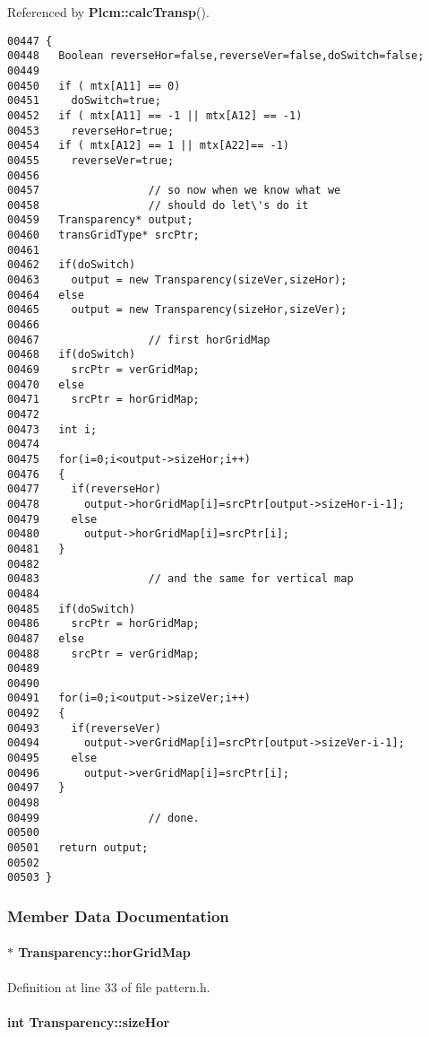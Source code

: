 Referenced by {\bf Plcm::calc\-Transp}().\small\begin{verbatim}00447 {
00448   Boolean reverseHor=false,reverseVer=false,doSwitch=false;
00449 
00450   if ( mtx[A11] == 0)
00451     doSwitch=true;
00452   if ( mtx[A11] == -1 || mtx[A12] == -1)
00453     reverseHor=true;
00454   if ( mtx[A12] == 1 || mtx[A22]== -1)
00455     reverseVer=true;
00456 
00457                 // so now when we know what we 
00458                 // should do let\'s do it
00459   Transparency* output;
00460   transGridType* srcPtr;
00461 
00462   if(doSwitch)
00463     output = new Transparency(sizeVer,sizeHor);
00464   else
00465     output = new Transparency(sizeHor,sizeVer);
00466 
00467                 // first horGridMap
00468   if(doSwitch)
00469     srcPtr = verGridMap;
00470   else
00471     srcPtr = horGridMap;
00472 
00473   int i;
00474 
00475   for(i=0;i<output->sizeHor;i++)
00476   {
00477     if(reverseHor)
00478       output->horGridMap[i]=srcPtr[output->sizeHor-i-1];
00479     else
00480       output->horGridMap[i]=srcPtr[i];
00481   }
00482 
00483                 // and the same for vertical map
00484 
00485   if(doSwitch)
00486     srcPtr = horGridMap;
00487   else
00488     srcPtr = verGridMap;
00489   
00490 
00491   for(i=0;i<output->sizeVer;i++)
00492   {
00493     if(reverseVer)
00494       output->verGridMap[i]=srcPtr[output->sizeVer-i-1];
00495     else
00496       output->verGridMap[i]=srcPtr[i];
00497   }
00498 
00499                 // done.
00500 
00501   return output;
00502 
00503 }
\end{verbatim}\normalsize 


\subsubsection{Member Data Documentation}
\label{Transparency_m1}
\paragraph{ $\ast$ Transparency::hor\-Grid\-Map}\hfill



Definition at line 33 of file pattern.h.\label{Transparency_m2}
\paragraph{\setlength{\rightskip}{0pt plus 5cm}int Transparency::size\-Hor}\hfill



